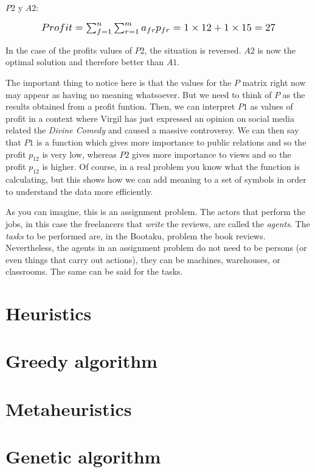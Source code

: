 $P2$ y $A2$:

\begin{equation}
    \scalebox{1.2}{$Profit = \sum_{f=1}^n \sum_{r=1}^m a_{fr} p_{fr} = 1 \times 12 + 1 \times 15 = 27$}
\end{equation}

In the case of the profits values of $P2$, the situation is reversed. $A2$ is now the optimal solution and therefore better than $A1$.

The important thing to notice here is that the values for the $P$ matrix right now may appear as having no meaning whatsoever. But we need to think of $P$ as the results obtained from a profit funtion. Then, we can interpret $P1$ as values of profit in a context where Virgil has just expressed an opinion on social media related the \textit{Divine Comedy} and caused a massive controversy. We can then say that $P1$ is a function which gives more importance to public relations and so the profit $p_{12}$ is very low, whereas $P2$ gives more importance to views and so the profit $p_{12}$ is higher. Of course, in a real problem you know what the function is calculating, but this shows how we can add meaning to a set of symbols in order to understand the data more efficiently.

As you can imagine, this is an assignment problem. The actors that perform the jobs, in this case the freelancers that \textit{write} the reviews, are called the \textit{agents}. The \textit{tasks} to be performed are, in the Bootaku, problem the book reviews. Nevertheless, the agents in an assignment problem do not need to be persons (or even things that carry out actions), they can be machines, warehouses, or classrooms. The same can be said for the tasks.


\section{Heuristics}


\section{Greedy algorithm}


\section{Metaheuristics}


\section{Genetic algorithm}

